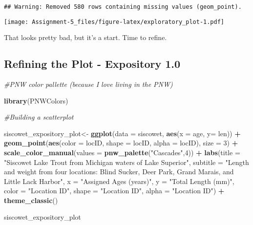 \documentclass[
]{article}
\newenvironment{Shaded}{\begin{snugshade}}{\end{snugshade}}
\newcommand{\CommentTok}[1]{\textcolor[rgb]{0.56,0.35,0.01}{\textit{#1}}}
\newcommand{\DataTypeTok}[1]{\textcolor[rgb]{0.13,0.29,0.53}{#1}}
\newcommand{\DecValTok}[1]{\textcolor[rgb]{0.00,0.00,0.81}{#1}}
\newcommand{\KeywordTok}[1]{\textcolor[rgb]{0.13,0.29,0.53}{\textbf{#1}}}
\newcommand{\NormalTok}[1]{#1}
\newcommand{\OperatorTok}[1]{\textcolor[rgb]{0.81,0.36,0.00}{\textbf{#1}}}
\newcommand{\StringTok}[1]{\textcolor[rgb]{0.31,0.60,0.02}{#1}}
\begin{document}
\begin{verbatim}
## Warning: Removed 580 rows containing missing values (geom_point).
\end{verbatim}

\texttt{[image: Assignment-5\_files/figure-latex/exploratory\_plot-1.pdf]}

That looks pretty bad, but it's a start. Time to refine.

\hypertarget{refining-the-plot---expository-1.0}{%
\subsection{Refining the Plot - Expository
1.0}\label{refining-the-plot---expository-1.0}}

\begin{Shaded}
\begin{Highlighting}[]
\CommentTok{#PNW color pallette (because I love living in the PNW)}

\KeywordTok{library}\NormalTok{(PNWColors)}

\CommentTok{#Building a scatterplot }

\NormalTok{siscowet_expository_plot<-}\StringTok{ }\KeywordTok{ggplot}\NormalTok{(}\DataTypeTok{data =}\NormalTok{ siscowet, }
       \KeywordTok{aes}\NormalTok{(}\DataTypeTok{x =}\NormalTok{ age, }
       \DataTypeTok{y=}\NormalTok{ len)) }\OperatorTok{+}\StringTok{ }
\StringTok{  }\KeywordTok{geom_point}\NormalTok{(}\KeywordTok{aes}\NormalTok{(}\DataTypeTok{color =}\NormalTok{ locID, }
                 \DataTypeTok{shape =}\NormalTok{ locID, }
                 \DataTypeTok{alpha =}\NormalTok{ locID),}
             \DataTypeTok{size =} \DecValTok{3}\NormalTok{) }\OperatorTok{+}
\StringTok{  }\KeywordTok{scale_color_manual}\NormalTok{(}\DataTypeTok{values =} \KeywordTok{pnw_palette}\NormalTok{(}\StringTok{"Cascades"}\NormalTok{,}\DecValTok{4}\NormalTok{)) }\OperatorTok{+}
\StringTok{  }\KeywordTok{labs}\NormalTok{(}\DataTypeTok{title =} \StringTok{"Siscowet Lake Trout from Michigan waters of Lake Superior"}\NormalTok{,}
       \DataTypeTok{subtitle =} \StringTok{"Length and weight from four locations: Blind Sucker, Deer Park, Grand Marais, and  Little Lack Harbor"}\NormalTok{,}
       \DataTypeTok{x =} \StringTok{"Assigned Ages (years)"}\NormalTok{,}
       \DataTypeTok{y =} \StringTok{"Total Length (mm)"}\NormalTok{,}
       \DataTypeTok{color =} \StringTok{"Location ID"}\NormalTok{,}
       \DataTypeTok{shape =} \StringTok{"Location ID"}\NormalTok{, }
       \DataTypeTok{alpha =} \StringTok{"Location ID"}\NormalTok{) }\OperatorTok{+}
\StringTok{  }\KeywordTok{theme_classic}\NormalTok{()}

\NormalTok{siscowet_expository_plot}
\end{Highlighting}
\end{Shaded}
\end{document}
